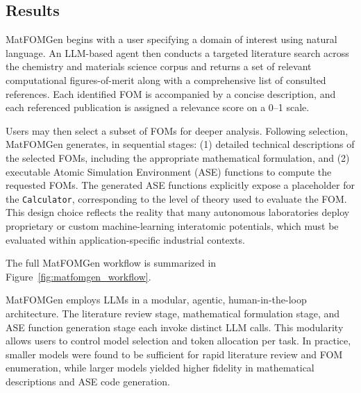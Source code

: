 \subsection*{Results}

MatFOMGen begins with a user specifying a domain of interest using natural language. An LLM-based agent then conducts a targeted literature search across the chemistry and materials science corpus and returns a set of relevant computational figures-of-merit along with a comprehensive list of consulted references. Each identified FOM is accompanied by a concise description, and each referenced publication is assigned a relevance score on a 0–1 scale.  

Users may then select a subset of FOMs for deeper analysis. Following selection, MatFOMGen generates, in sequential stages: (1) detailed technical descriptions of the selected FOMs, including the appropriate mathematical formulation, and (2) executable Atomic Simulation Environment (ASE) functions \cite{larsen2017atomic} to compute the requested FOMs. The generated ASE functions explicitly expose a placeholder for the \texttt{Calculator}, corresponding to the level of theory used to evaluate the FOM. This design choice reflects the reality that many autonomous laboratories deploy proprietary or custom machine-learning interatomic potentials, which must be evaluated within application-specific industrial contexts.  

The full MatFOMGen workflow is summarized in Figure~\ref{fig:matfomgen_workflow}.

MatFOMGen employs LLMs in a modular, agentic, human-in-the-loop architecture. The literature review stage, mathematical formulation stage, and ASE function generation stage each invoke distinct LLM calls. This modularity allows users to control model selection and token allocation per task. In practice, smaller models were found to be sufficient for rapid literature review and FOM enumeration, while larger models yielded higher fidelity in mathematical descriptions and ASE code generation.

